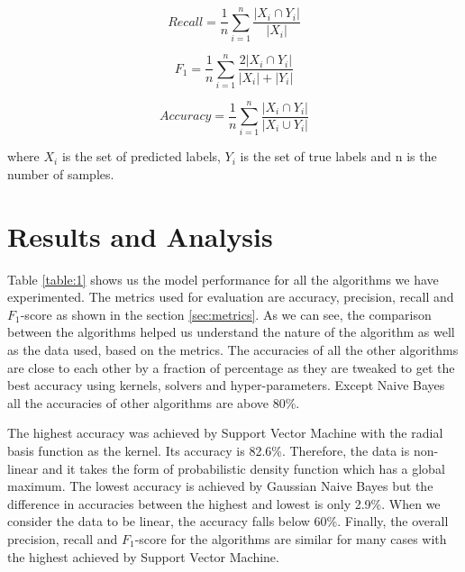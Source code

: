\documentclass[conference]{IEEEtran}
\begin{document}
\begin{equation}
Recall = \frac{1}{n}\sum\limits_{i=1}^{n} \frac{|X_i \cap Y_i|}{|X_i|}
\end{equation}

\begin{equation}
F_1 = \frac{1}{n}\sum\limits_{i=1}^{n} \frac{2|X_i \cap Y_i|}{|X_i| + |Y_i|}
\end{equation}

\begin{equation}
Accuracy = \frac{1}{n}\sum\limits_{i=1}^{n} \frac{|X_i \cap Y_i|}{|X_i \cup Y_i|}
\end{equation}

where $X_i$ is the set of predicted labels, $Y_i$ is the set of true labels and n is the number of samples.

\section{Results and Analysis}
Table \ref{table:1} shows us the model performance for all the algorithms we have experimented. The metrics used for evaluation are accuracy, precision, recall and $F_1$-score as shown in the section \ref{sec:metrics}. As we can see, the comparison between the algorithms helped us understand the nature of the algorithm as well as the data used, based on the metrics. The accuracies of all the other algorithms are close to each other by a fraction of percentage as they are tweaked to get the best accuracy using kernels, solvers and hyper-parameters. Except Naive Bayes all the accuracies of other algorithms are above 80\%. 
\par
The highest accuracy was achieved by Support Vector Machine with the radial basis function as the kernel. Its accuracy is 82.6\%. Therefore, the data is non-linear and it takes the form of probabilistic density function which has a global maximum. The lowest accuracy is achieved by Gaussian Naive Bayes but the difference in accuracies between the highest and lowest is only 2.9\%. When we consider the data to be linear, the accuracy falls below 60\%. Finally, the overall precision, recall and $F_1$-score for the algorithms are similar for many cases with the highest achieved by Support Vector Machine.
\par
\end{document}
